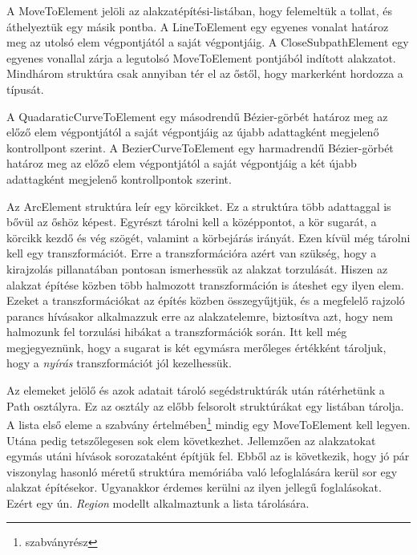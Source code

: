 \documentclass[12pt]{report}
\theoremstyle{definition}
\newcommand{\func}[1]{{\textsf{\footnotesize{#1}}}}
\begin{document}
A \func{MoveToElement} jelöli az alakzatépítési-listában, hogy felemeltük a
tollat, és áthelyeztük egy másik pontba. A \func{LineToElement} egy egyenes
vonalat határoz meg az utolsó elem végpontjától a saját végpontjáig. A
\func{CloseSubpathElement} egy egyenes vonallal zárja a legutolsó
\func{MoveToElement} pontjából indított alakzatot. Mindhárom struktúra csak
annyiban tér el az őstől, hogy markerként hordozza a típusát.

A \func{QuadaraticCurveToElement} egy másodrendű Bézier-görbét határoz meg az
előző elem végpontjától a saját végpontjáig az újabb adattagként megjelenő
kontrollpont szerint. A \func{BezierCurveToElement} egy harmadrendű
Bézier-görbét határoz meg az előző elem végpontjától a saját végpontjáig a két
újabb adattagként megjelenő kontrollpontok szerint.

Az \func{ArcElement} struktúra leír egy körcikket. Ez a struktúra több
adattaggal is bővül az őshöz képest. Egyrészt tárolni kell a középpontot, a kör
sugarát, a körcikk kezdő és vég szögét, valamint a körbejárás irányát. Ezen
kívül még tárolni kell egy transzformációt. Erre a transzformációra azért van
szükség, hogy a kirajzolás pillanatában pontosan ismerhessük az alakzat
torzulását. Hiszen az alakzat építése közben több halmozott transzformáción is
áteshet egy ilyen elem. Ezeket a transzformációkat az építés közben
összegyűjtjük, és a megfelelő rajzoló parancs hívásakor alkalmazzuk erre az
alakzatelemre, biztosítva azt, hogy nem halmozunk fel torzulási hibákat a
transzformációk során. Itt kell még megjegyeznünk, hogy a sugarat is két
egymásra merőleges értékként tároljuk, hogy a \emph{nyírás} transzformációt jól
kezelhessük.

Az elemeket jelölő és azok adatait tároló segédstruktúrák után rátérhetünk a
\func{Path} osztályra. Ez az osztály az előbb felsorolt struktúrákat egy
listában tárolja. A lista első eleme a szabvány
értelmében\footnote{szabványrész} mindig egy \func{MoveToElement} kell legyen.
Utána pedig tetszőlegesen sok elem következhet. Jellemzően az alakzatokat
egymás utáni hívások sorozataként építjük fel. Ebből az is következik, hogy jó
pár viszonylag hasonló méretű struktúra memóriába való lefoglalására kerül sor
egy alakzat építésekor. Ugyanakkor érdemes kerülni az ilyen jellegű
foglalásokat. Ezért egy ún. \emph{Region} modellt alkalmaztunk a lista
tárolására.
\end{document}
